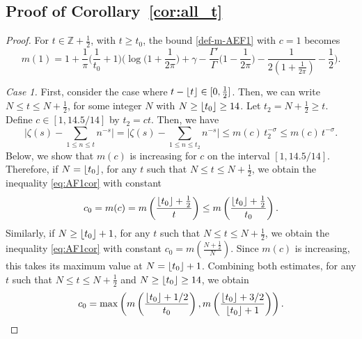 \documentclass[11pt,letterpaper,oneside,reqno]{amsart}
\DeclarePairedDelimiter\floor{\lfloor}{\rfloor}
\renewcommand{\^}[1]{\widehat{#1}}
\newcommand{\Z}{{\mathbb{Z}}}
\newcommand{\s}{\sigma}
\numberwithin{equation}{section}
\theoremstyle{remark}
\newcommand*{\corref}[1]{Corollary~\ref{#1}}
\begin{document}
\subsection{Proof of \corref{cor:all_t}}\label{sec:all_t}
\begin{proof}
For $t\in \Z+\frac{1}{2}$, with $t \geq t_0$, the bound \eqref{def-m-AEF1} with $c=1$ becomes
\[
 m(1) =  1 
    + \frac{1}{\pi }  \Big( \frac{1}{t_0} + 1 \Big) \bigg(  \log \Big(1+\frac{1}{2\pi } \Big) + \gamma - \frac{\Gamma'}{\Gamma}\Big(1-\frac{1}{2\pi }\Big)-\frac{1}{2(1+\frac{1}{2\pi })}-\frac{1}{2}\bigg).   
    \]

\textit{Case 1.} 
First, consider the case where $t-\floor{t}\in[0,\frac{1}{2}]$. Then, we can write $N\le t \le N+\frac{1}{2}$, for some integer $N$ with $N\ge \floor{t_0}  \ge 14$. Let $t_2=N+\frac{1}{2} \geq t$. Define $c\in[1,14.5/14]$ by $t_2=ct$. Then, we have 
\begin{equation*} \bigg| \zeta(s)
    - \sum_{1\le n\leq t}n^{-s} \bigg| = \bigg| \zeta(s)
    - \sum_{1\le n\leq t_2}n^{-s} \bigg| 
    \leq m (c) \,  t_2^{-\s} \leq  m (c) \, t^{-\s}.
\end{equation*}
%
Below, we show that $m(c)$ is increasing for $c$ on the interval $[1,14.5/14]$. Therefore, if $N=\floor{t_0}$, for any $t$ such that $N\le t \le N+\frac{1}{2}$, we obtain the inequality \eqref{eq:AF1cor} with constant 
\[ c_0=m(c) =m\left(\frac{\floor{t_0}+\frac{1}{2}}{t}\right) \le m\left(\frac{\floor{t_0}+\frac{1}{2}}{t_0}\right).\]
Similarly, if $N\ge \floor{t_0}+1$, for any $t$ such that $N\le t \le N+\frac{1}{2}$, we obtain the inequality \eqref{eq:AF1cor} with constant $c_0=m\left(\frac{N+\frac{1}{2}}{N}\right)$. Since $m(c)$ is increasing, this takes its maximum value at $N=\floor{t_0}+1$.
%
Combining both estimates, for any $t$ such that $N\le t \le N+\frac{1}{2}$ and $N\ge \floor{t_0}\ge 14$, we obtain 
\begin{equation}\label{eq:c0-1}
  c_0=\max\left( m\left(\frac{\floor{t_0}+1/2}{t_0}\right), 
  m\left(\frac{\floor{t_0}+3/2}{\floor{t_0}+1}\right) \right).  
\end{equation} 


\end{proof}
\end{document}

